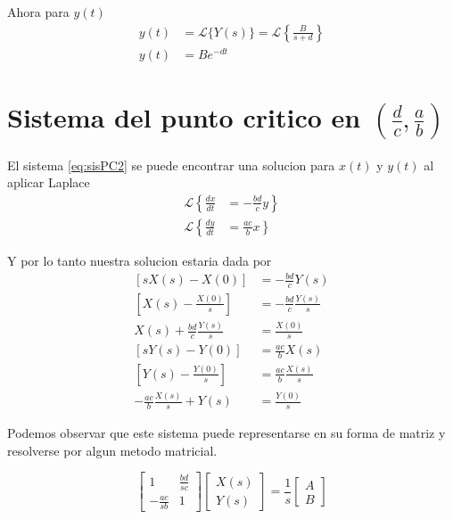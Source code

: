 \documentclass{report}
\begin{document}
Ahora para $y(t)$
\begin{align}
y(t)&=\mathcal{L}\{Y(s)\} =\mathcal{L}\left\{ \frac{B}{s+d}
\right\}\nonumber\\
y(t)&=Be^{-dt}
\end{align}

\section{Sistema del punto critico en $(\frac{d}{c},\frac{a}{b})$}
El sistema \ref{eq:sisPC2} se puede encontrar una solucion para $x(t)$ y $y(t)$ al aplicar Laplace 
\begin{align*}
\mathcal{L}\left\{ \frac{dx}{dt}\right.
&=\left. -\frac{bd}{c}y  \right\}
\\
\mathcal{L}\left\{ \frac{dy}{dt}\right.
&= \left.\frac{ac}{b}x  \right\}
\end{align*}

Y por lo tanto nuestra solucion estaria dada por
\begin{subequations}
\begin{align}
[sX(s)-X(0)]&=-\frac{bd}{c}Y(s) \nonumber \\
[X(s)-\frac{X(0)}{s}]&=-\frac{bd}{c}\frac{Y(s)}{s} \nonumber\\
X(s)+\frac{bd}{c}\frac{Y(s)}{s}&=\frac{X(0)}{s} \label{eq:lapXs} \\
[sY(s)-Y(0)]&=\frac{ac}{b}X(s) \nonumber \\
[Y(s)-\frac{Y(0)}{s}]&=\frac{ac}{b}\frac{X(s)}{s} \nonumber \\
-\frac{ac}{b}\frac{X(s)}{s}+Y(s)&=\frac{Y(0)}{s} \label{eq:lapYs}
\end{align}
\end{subequations}

Podemos observar que este sistema puede representarse en su forma de matriz y resolverse por algun metodo matricial.

\begin{equation}
\left[\begin{matrix}
1 &\frac{bd}{sc} \\
-\frac{ac}{sb} &1
\end{matrix}\right]
\left[\begin{array}{c}
X(s)\\
Y(s)
\end{array}\right]
=
\frac{1}{s}\left[\begin{array}{c}
A\\
B
\end{array}\right]\label{eq:sistemAnLaplace}
\end{equation}
\end{document}
